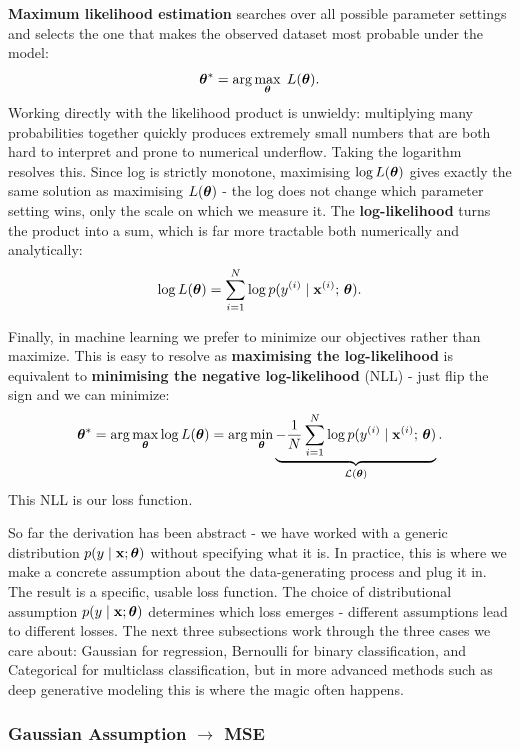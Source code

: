 \textbf{Maximum likelihood estimation} searches over all possible parameter settings and selects the one that makes the observed dataset most probable under the model:
\begin{equation}
    \boldsymbol{\theta}^* = \arg\max_{\boldsymbol{\theta}}\; L(\boldsymbol{\theta}).
\end{equation}
Working directly with the likelihood product is unwieldy: multiplying many probabilities together quickly produces extremely small numbers that are both hard to interpret and prone to numerical underflow. Taking the logarithm resolves this. Since log is strictly monotone, maximising $\log L(\boldsymbol{\theta})$ gives exactly the same solution as maximising $L(\boldsymbol{\theta})$ - the log does not change which parameter setting wins, only the scale on which we measure it. The \textbf{log-likelihood} turns the product into a sum, which is far more tractable both numerically and analytically:
\begin{equation}
    \log L(\boldsymbol{\theta}) = \sum_{i=1}^{N} \log p(y^{(i)} \mid \mathbf{x}^{(i)};\, \boldsymbol{\theta}).
\end{equation}

Finally, in machine learning we prefer to minimize our objectives rather than maximize. This is easy to resolve as \textbf{maximising the log-likelihood} is equivalent to \textbf{minimising the negative log-likelihood} (NLL) - just flip the sign and we can minimize:
\begin{equation}
    \boldsymbol{\theta}^* = \arg\max_{\boldsymbol{\theta}} \log L(\boldsymbol{\theta}) = \arg\min_{\boldsymbol{\theta}} \underbrace{-\frac{1}{N}\sum_{i=1}^{N} \log p(y^{(i)} \mid \mathbf{x}^{(i)};\, \boldsymbol{\theta})}_{\mathcal{L}(\boldsymbol{\theta})}.
\end{equation}
This NLL is our loss function. 

So far the derivation has been abstract - we have worked with a generic distribution $p(y \mid \mathbf{x}; \boldsymbol{\theta})$ without specifying what it is. In practice, this is where we make a concrete assumption about the data-generating process and plug it in. The result is a specific, usable loss function. The choice of distributional assumption $p(y \mid \mathbf{x}; \boldsymbol{\theta})$ determines which loss emerges - different assumptions lead to different losses. The next three subsections work through the three cases we care about: Gaussian for regression, Bernoulli for binary classification, and Categorical for multiclass classification, but in more advanced methods such as deep generative modeling this is where the magic often happens. 

\subsubsection{Gaussian Assumption $\to$ MSE}


